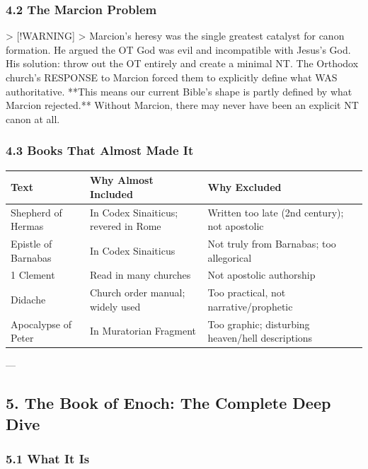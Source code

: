 \documentclass[aps,prd,11pt,onecolumn,superscriptaddress,nofootinbib,floatfix]{revtex4-2}
\begin{document}
\subsubsection{4.2 The Marcion Problem}


> [!WARNING]
> Marcion's heresy was the single greatest catalyst for canon formation. He argued the OT God was evil and incompatible with Jesus's God. His solution: throw out the OT entirely and create a minimal NT. The Orthodox church's RESPONSE to Marcion forced them to explicitly define what WAS authoritative. **This means our current Bible's shape is partly defined by what Marcion rejected.** Without Marcion, there may never have been an explicit NT canon at all.


\subsubsection{4.3 Books That Almost Made It}


\begin{table}[h!]
\centering
\begin{tabular}{p{3cm}p{3cm}p{3cm}}
\hline
Text & Why Almost Included & Why Excluded \\
\hline
Shepherd of Hermas & In Codex Sinaiticus; revered in Rome & Written too late (2nd century); not apostolic \\
Epistle of Barnabas & In Codex Sinaiticus & Not truly from Barnabas; too allegorical \\
1 Clement & Read in many churches & Not apostolic authorship \\
Didache & Church order manual; widely used & Too practical, not narrative/prophetic \\
Apocalypse of Peter & In Muratorian Fragment & Too graphic; disturbing heaven/hell descriptions \\
\hline
\end{tabular}
\end{table}



---


\subsection{5. The Book of Enoch: The Complete Deep Dive}


\subsubsection{5.1 What It Is}
\end{document}
